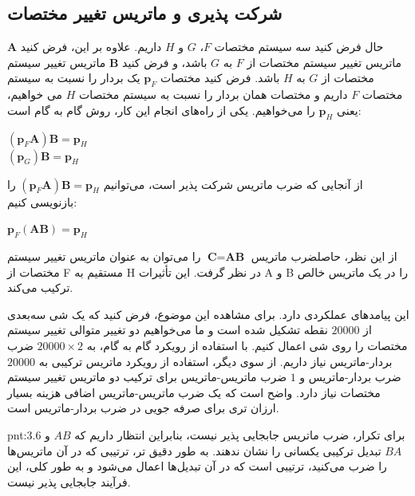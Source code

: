 \subsection{\textbf{شرکت پذیری و ماتریس تغییر مختصات}}
\label{subsec:3.4.4}
{
    \Large
    \begin{spacing}{1.5}
        حال فرض کنید سه سیستم مختصات $F$، $G$ و $H$ داریم. علاوه بر این، فرض کنید $\textbf{A}$ ماتریس تغییر سیستم مختصات از $F$ به $G$ باشد،
        و فرض کنید $\textbf{B}$ ماتریس تغییر سیستم مختصات از $G$ به $H$ باشد.
        فرض کنید مختصات $\textbf{p}_{F}$ یک بردار را نسبت به سیستم مختصات $F$ داریم و مختصات همان بردار را نسبت به سیستم مختصات $H$ می خواهیم،
        یعنی $\textbf{p}_{H}$ را می‌خواهیم.
        یکی از راه‌های انجام این کار، روش گام به گام است:
        \begin{center}
            $(\textbf{p}_{F}\textbf{A})\textbf{B}=\textbf{p}_{H}$ \\
            $(\textbf{p}_{G})\textbf{B}=\textbf{p}_{H}$
        \end{center}

        از آنجایی که ضرب ماتریس شرکت پذیر است، می‌توانیم $(\textbf{p}_{F}\textbf{A})\textbf{B}=\textbf{p}_{H}$ را بازنویسی کنیم:
        \begin{center}
            $\textbf{p}_{F}(\textbf{A}\textbf{B})=\textbf{p}_{H}$
        \end{center}

        از این نظر، حاصلضرب ماتریس $\textbf{C}=\textbf{AB}$ را می‌توان به عنوان ماتریس تغییر سیستم مختصات از F مستقیم به H در نظر گرفت.
        این تأثیرات A و B را در یک ماتریس خالص ترکیب می‌کند.

        این پیامدهای عملکردی دارد. برای مشاهده این موضوع، فرض کنید که یک شی سه‌بعدی از $20000$ نقطه تشکیل شده است و ما می‌خواهیم دو تغییر متوالی تغییر سیستم مختصات را روی شی اعمال کنیم.
        با استفاده از رویکرد گام به گام، به $20000\times 2$ ضرب بردار-ماتریس نیاز داریم. از سوی دیگر، استفاده از رویکرد ماتریس ترکیبی به $20000$ ضرب بردار-ماتریس و $1$ ضرب ماتریس-ماتریس برای ترکیب دو ماتریس تغییر سیستم مختصات نیاز دارد.
        واضح است که یک ضرب ماتریس-ماتریس اضافی هزینه بسیار ارزان تری برای صرفه جویی در ضرب بردار-ماتریس است.

        \begin{point}{pnt:3.6}
            \Large
            برای تکرار، ضرب ماتریس جابجایی پذیر نیست، بنابراین انتظار داریم که $AB$ و $BA$ تبدیل ترکیبی یکسانی را نشان ندهند.
            به طور دقیق تر، ترتیبی که در آن ماتریس‌ها را ضرب می‌کنید، ترتیبی است که در آن تبدیل‌ها اعمال می‌شود و به طور کلی، این فرآیند جابجایی پذیر نیست.
        \end{point}
    \end{spacing}
}

